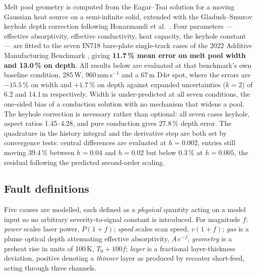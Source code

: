 \documentclass[final,5p,times,twocolumn]{elsarticle}
\begin{document}
Melt pool geometry is computed from the Eagar--Tsai solution for a moving Gaussian
heat source on a semi-infinite solid, extended with the Gladush--Smurov keyhole
depth correction following Honarmandi et al.\ \cite{Hon2021}. Four parameters ---
effective absorptivity, effective conductivity, heat capacity, the keyhole
constant --- are fitted to the seven IN718 bare-plate single-track cases of the
2022 Additive Manufacturing Benchmark \cite{Weaver2024}, giving \textbf{11.7\,\%
mean error on melt pool width and 13.0\,\% on depth}. All results below are evaluated at that benchmark's own baseline condition,
285\,W, 960\,mm\,s$^{-1}$ and a 67\,\textmu m D4$\sigma$ spot, where the errors
are $-15.5$\,\% on width and $+1.7$\,\% on depth against expanded uncertainties
($k=2$) of 6.2 and 14.1\,\textmu m respectively. Width is under-predicted at all seven conditions, the one-sided bias of a
conduction solution with no mechanism that widens a pool. The keyhole correction
is necessary rather than optional: all seven cases keyhole, aspect ratios
1.45--4.28, and pure conduction gives 27.8\,\% depth error. The quadrature in the
history integral and the derivative step are both set by convergence tests:
central differences are evaluated at $h=0.002$, entries still moving 39.4\,\%
between $h=0.04$ and $h=0.02$ but below 0.3\,\% at $h=0.005$, the residual
following the predicted second-order scaling.

\subsection{Fault definitions}

Five causes are modelled, each defined as a \emph{physical} quantity acting on a
model input so no arbitrary severity-to-signal constant is introduced. For
magnitude $f$: \emph{power} scales laser power, $P(1+f)$; \emph{speed} scales
scan speed, $v(1+f)$; \emph{gas} is a plume optical depth attenuating effective
absorptivity, $A\,e^{-f}$; \emph{geometry} is a preheat rise in units of 100\,K,
$T_0+100f$; \emph{layer} is a fractional layer-thickness deviation, positive
denoting a \emph{thinner} layer as produced by recoater short-feed, acting
through three channels.
\end{document}
